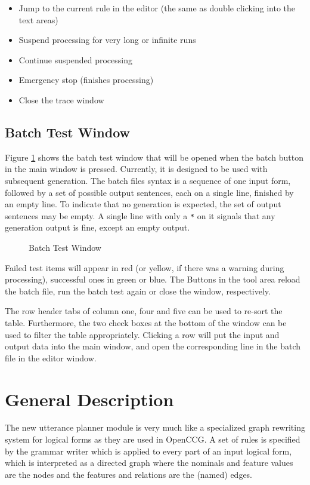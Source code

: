 \documentclass[11pt,a4paper]{report}
\begin{document}
\begin{itemize}\addtolength{\itemsep}{-.7\itemsep}
\item Jump to the current rule in the editor (the same as double clicking into
  the text areas)
\item Suspend processing for very long or infinite runs
\item Continue suspended processing
\item Emergency stop (finishes processing)
\item Close the trace window
\end{itemize}

\section{Batch Test Window}

Figure \ref{fig:batchwindow} shows the batch test window that will be opened
when the batch button in the main window is pressed. Currently, it is designed
to be used with subsequent generation. The batch files syntax is a sequence of
one input form, followed by a set of possible output sentences, each on a
single line, finished by an empty line. To indicate that no generation is
expected, the set of output sentences may be empty. A single line with only a
\texttt{*} on it signals that any generation output is fine, except an empty
output.

\begin{figure}[htbp]
  \centering
  \caption{Batch Test Window}
  \label{fig:batchwindow}
\end{figure}

Failed test items will appear in red (or yellow, if there was a warning
during processing), successful ones in green or blue. The Buttons in the
tool area reload the batch file, run the batch test again or close the window,
respectively.

The row header tabs of column one, four and five can be used to re-sort the
table. Furthermore, the two check boxes at the bottom of the window can be used
to filter the table appropriately. Clicking a row will put the input and
output data into the main window, and open the corresponding line in the batch
file in the editor window.

\chapter{General Description}
The new utterance planner module is very much like a specialized graph
rewriting system for logical forms as they are used in OpenCCG. A set of
rules is specified by the grammar writer which is applied to every part of
an input logical form, which is interpreted as a directed graph where the
nominals and feature values are the nodes and the features and relations are
the (named) edges.
\end{document}

